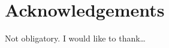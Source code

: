 \documentclass[12pt,a4paper,twoside]{article}
\theoremstyle{definition} %
\theoremstyle{plain} %
\numberwithin{equation}{section}  %
\renewcommand{\listfigurename}{Kazalo slik}%
\begin{document}
%
%
%
%

\section*{Acknowledgements}
Not obligatory.
I would like to thank\dots

\cleardoublepage

\tableofcontents


\cleardoublepage
\end{document}
